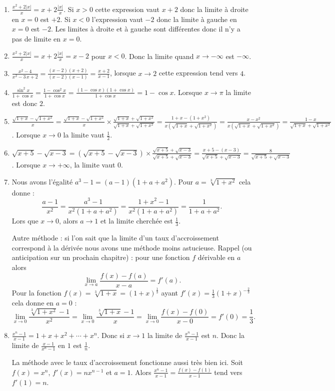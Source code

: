\documentclass[11pt,a4paper]{article}
\begin{document}
\begin{enumerate}
  \item $\frac{x^2+2|x|}{x} = x + 2 \frac{|x|}{x}$.
Si $x > 0$ cette expression vaut $x+2$ donc la limite à droite en $x=0$ est $+2$.
Si $x<0$ l'expression vaut $-2$ donc la limite à gauche en $x=0$ est $-2$.
Les limites \`a droite et à gauche sont différentes donc il n'y a pas de limite en $x=0$.

  \item $\frac{x^2+2|x|}{x} = x + 2 \frac{|x|}{x} = x -2$ pour $x<0$.
Donc la limite quand $x \to -\infty$ est $-\infty$.

  \item $\frac{x^2-4}{x^2-3\,x+2}=\frac{(x-2)(x+2)}{(x-2)(x-1)} = \frac{x+2}{x-1}$,
lorsque $x\to 2$ cette expression tend vers $4$.

  \item $\frac{\sin^2 x}{1+\cos x} = \frac{1-\cos^2 x}{1+\cos x} = \frac{(1-\cos x)(1+\cos x)}{1+\cos x} = 1-\cos x$.
Lorsque $x\to \pi$ la limite est donc $2$.

  \item $\frac{\sqrt{1+x}-\sqrt{1+x^2}}{x} = \frac{\sqrt{1+x}-\sqrt{1+x^2}}{x}\times\frac{\sqrt{1+x}+\sqrt{1+x^2}}{\sqrt{1+x}+\sqrt{1+x^2}}
= \frac{1+x - (1+x^2)}{x(\sqrt{1+x}+\sqrt{1+x^2})} = \frac{x - x^2}{x(\sqrt{1+x}+\sqrt{1+x^2})} = \frac{1-x}{\sqrt{1+x}+\sqrt{1+x^2}}$.
Lorsque $x\to 0$ la limite vaut $\frac 12$.

  \item $\sqrt{x+5}-\sqrt{x-3} = \left( \sqrt{x+5}-\sqrt{x-3}\right) \times \frac{\sqrt{x+5}+\sqrt{x-3}}{\sqrt{x+5}+\sqrt{x-3}}
= \frac{x+5-(x-3)}{\sqrt{x+5}+\sqrt{x-3}} = \frac{8}{\sqrt{x+5}+\sqrt{x-3}}$. Lorsque $x \to +\infty$, la limite vaut $0$.

  \item Nous avons l'égalité $a^3-1 = (a-1)(1+a+a^2)$. Pour $a = \sqrt[3]{1+x^2}$
cela donne :
$$\frac{a-1}{x^2} = \frac{a^3-1}{x^2(1+a+a^2)} = \frac{1+x^2-1}{x^2(1+a+a^2)} = \frac{1}{1+a+a^2}.$$
Lors que $x\to 0$, alors $a \to 1$ et la limite cherchée est $\frac 13$.

Autre méthode : si l'on sait que la limite d'un taux d'accroissement correspond à la dérivée nous avons une méthode moins
astucieuse. Rappel (ou anticipation sur un prochain chapitre) : pour une fonction $f$ dérivable en $a$ alors
$$\lim_{x\to a} \frac{f(x)-f(a)}{x-a} = f'(a).$$
Pour la fonction $f(x) = \sqrt[3]{1+x} =(1+x)^{\frac 13}$ ayant $f'(x) = \frac 13 (1+x)^{-\frac 23}$ cela donne en $a=0$ :
$$\lim_{x\to 0} \frac{\sqrt[3]{1+x^2} -1}{x^2} = \lim_{x\to 0} \frac{\sqrt[3]{1+x} -1}{x} = \lim_{x\to 0} \frac{f(x)-f(0)}{x-0} = f'(0) = \frac 13.$$

  \item $\frac{x^n-1}{x-1} = 1+x+x^2+\cdots + x^n$. Donc si $x\to 1$ la limite de  $\frac{x^n-1}{x-1}$ est  $n$.
Donc la limite de $\frac{x-1}{x^n-1}$ en $1$ est $\frac 1n$.

La méthode avec le taux d'accroissement fonctionne aussi très bien ici. Soit $f(x) = x^n$, $f'(x)=nx^{n-1}$ et $a=1$.
Alors $\frac{x^n-1}{x-1} = \frac{f(x)-f(1)}{x-1}$ tend vers $f'(1)=n$.
\end{enumerate}
\end{document}
